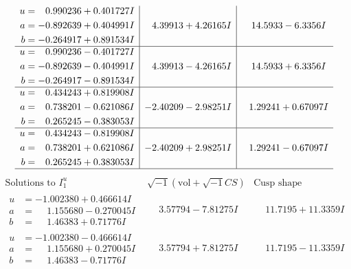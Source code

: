 \documentclass[1p]{elsarticle_modified}
\theoremstyle{definition}
\newcommand{\I}{\sqrt{-1}}
\begin{document}
$$\begin{array}{c|c|c}
\begin{aligned}
u &= \phantom{-}0.990236 + 0.401727 I \\
a &= -0.892639 + 0.404991 I \\
b &= -0.264917 + 0.891534 I\end{aligned}
 & \phantom{-}4.39913 + 4.26165 I & \phantom{-}14.5933 - 6.3356 I \\ \hline\begin{aligned}
u &= \phantom{-}0.990236 - 0.401727 I \\
a &= -0.892639 - 0.404991 I \\
b &= -0.264917 - 0.891534 I\end{aligned}
 & \phantom{-}4.39913 - 4.26165 I & \phantom{-}14.5933 + 6.3356 I \\ \hline\begin{aligned}
u &= \phantom{-}0.434243 + 0.819908 I \\
a &= \phantom{-}0.738201 - 0.621086 I \\
b &= \phantom{-}0.265245 - 0.383053 I\end{aligned}
 & -2.40209 - 2.98251 I & \phantom{-}1.29241 + 0.67097 I \\ \hline\begin{aligned}
u &= \phantom{-}0.434243 - 0.819908 I \\
a &= \phantom{-}0.738201 + 0.621086 I \\
b &= \phantom{-}0.265245 + 0.383053 I\end{aligned}
 & -2.40209 + 2.98251 I & \phantom{-}1.29241 - 0.67097 I\\
 \hline 
 \end{array}$$\newpage$$\begin{array}{c|c|c}  
\text{Solutions to }I^u_{1}& \I (\text{vol} + \sqrt{-1}CS) & \text{Cusp shape}\\
 \hline 
\begin{aligned}
u &= -1.002380 + 0.466614 I \\
a &= \phantom{-}1.155680 - 0.270045 I \\
b &= \phantom{-}1.46383 + 0.71776 I\end{aligned}
 & \phantom{-}3.57794 - 7.81275 I & \phantom{-}11.7195 + 11.3359 I \\ \hline\begin{aligned}
u &= -1.002380 - 0.466614 I \\
a &= \phantom{-}1.155680 + 0.270045 I \\
b &= \phantom{-}1.46383 - 0.71776 I\end{aligned}
 & \phantom{-}3.57794 + 7.81275 I & \phantom{-}11.7195 - 11.3359 I \\ \hline\begin{aligned}

\end{aligned}
\end{array}$$
\end{document}
